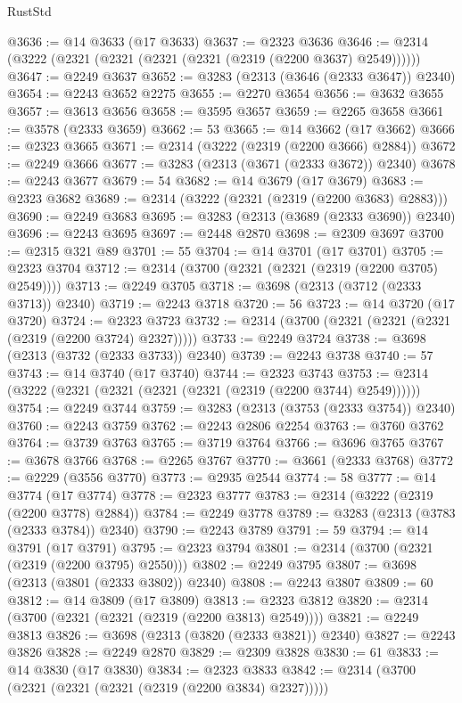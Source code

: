 \begin{lexlean}{RustStd}
\begin{coremodule}
{\begin{coremodule}
{{{{{{{{{{{{{{{{{{{{{{{{{{{{{{{{{{@3636 := @14 @3633 (@17 @3633)
@3637 := @2323 @3636
@3646 := @2314 (@3222 (@2321 (@2321 (@2321 (@2321 (@2319 (@2200 @3637) @2549))))))
@3647 := @2249 @3637
@3652 := @3283 (@2313 (@3646 (@2333 @3647)) @2340)
@3654 := @2243 @3652 @2275
@3655 := @2270 @3654
@3656 := @3632 @3655
@3657 := @3613 @3656
@3658 := @3595 @3657
@3659 := @2265 @3658
@3661 := @3578 (@2333 @3659)
@3662 := 53
@3665 := @14 @3662 (@17 @3662)
@3666 := @2323 @3665
@3671 := @2314 (@3222 (@2319 (@2200 @3666) @2884))
@3672 := @2249 @3666
@3677 := @3283 (@2313 (@3671 (@2333 @3672)) @2340)
@3678 := @2243 @3677
@3679 := 54
@3682 := @14 @3679 (@17 @3679)
@3683 := @2323 @3682
@3689 := @2314 (@3222 (@2321 (@2319 (@2200 @3683) @2883)))
@3690 := @2249 @3683
@3695 := @3283 (@2313 (@3689 (@2333 @3690)) @2340)
@3696 := @2243 @3695
@3697 := @2448 @2870
@3698 := @2309 @3697
@3700 := @2315 @321 @89
@3701 := 55
@3704 := @14 @3701 (@17 @3701)
@3705 := @2323 @3704
@3712 := @2314 (@3700 (@2321 (@2321 (@2319 (@2200 @3705) @2549))))
@3713 := @2249 @3705
@3718 := @3698 (@2313 (@3712 (@2333 @3713)) @2340)
@3719 := @2243 @3718
@3720 := 56
@3723 := @14 @3720 (@17 @3720)
@3724 := @2323 @3723
@3732 := @2314 (@3700 (@2321 (@2321 (@2321 (@2319 (@2200 @3724) @2327)))))
@3733 := @2249 @3724
@3738 := @3698 (@2313 (@3732 (@2333 @3733)) @2340)
@3739 := @2243 @3738
@3740 := 57
@3743 := @14 @3740 (@17 @3740)
@3744 := @2323 @3743
@3753 := @2314 (@3222 (@2321 (@2321 (@2321 (@2321 (@2319 (@2200 @3744) @2549))))))
@3754 := @2249 @3744
@3759 := @3283 (@2313 (@3753 (@2333 @3754)) @2340)
@3760 := @2243 @3759
@3762 := @2243 @2806 @2254
@3763 := @3760 @3762
@3764 := @3739 @3763
@3765 := @3719 @3764
@3766 := @3696 @3765
@3767 := @3678 @3766
@3768 := @2265 @3767
@3770 := @3661 (@2333 @3768)
@3772 := @2229 (@3556 @3770)
@3773 := @2935 @2544
@3774 := 58
@3777 := @14 @3774 (@17 @3774)
@3778 := @2323 @3777
@3783 := @2314 (@3222 (@2319 (@2200 @3778) @2884))
@3784 := @2249 @3778
@3789 := @3283 (@2313 (@3783 (@2333 @3784)) @2340)
@3790 := @2243 @3789
@3791 := 59
@3794 := @14 @3791 (@17 @3791)
@3795 := @2323 @3794
@3801 := @2314 (@3700 (@2321 (@2319 (@2200 @3795) @2550)))
@3802 := @2249 @3795
@3807 := @3698 (@2313 (@3801 (@2333 @3802)) @2340)
@3808 := @2243 @3807
@3809 := 60
@3812 := @14 @3809 (@17 @3809)
@3813 := @2323 @3812
@3820 := @2314 (@3700 (@2321 (@2321 (@2319 (@2200 @3813) @2549))))
@3821 := @2249 @3813
@3826 := @3698 (@2313 (@3820 (@2333 @3821)) @2340)
@3827 := @2243 @3826
@3828 := @2249 @2870
@3829 := @2309 @3828
@3830 := 61
@3833 := @14 @3830 (@17 @3830)
@3834 := @2323 @3833
@3842 := @2314 (@3700 (@2321 (@2321 (@2321 (@2319 (@2200 @3834) @2327)))))
}}}}}}}}}}}}}}}}}}}}}}}}}}}}}}}}}}
\end{coremodule}}
\end{coremodule}
\end{lexlean}
